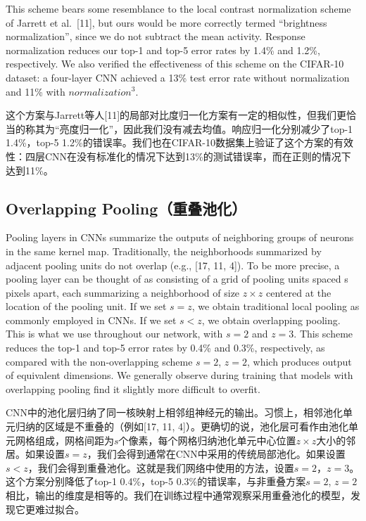 \documentclass[12pt,a4paper,UTF8,twoside]{book}
\begin{document}
This scheme bears some resemblance to the local contrast normalization scheme of Jarrett et al.~{[}11{]}, but ours would be more correctly termed ``brightness normalization'', since we do not subtract the mean activity. Response normalization reduces our top-1 and top-5 error rates by 1.4\% and 1.2\%, respectively. We also verified the effectiveness of this scheme on the CIFAR-10 dataset: a four-layer CNN achieved a 13\% test error rate without normalization and 11\% with \(normalization^3\).

这个方案与Jarrett等人{[}11{]}的局部对比度归一化方案有一定的相似性，但我们更恰当的称其为``亮度归一化''，因此我们没有减去均值。响应归一化分别减少了top-1 1.4\%，top-5 1.2\%的错误率。我们也在CIFAR-10数据集上验证了这个方案的有效性：四层CNN在没有标准化的情况下达到13\%的测试错误率，而在正则的情况下达到11\%。

\hypertarget{overlapping-poolingux91cdux53e0ux6c60ux5316}{%
\subsection{Overlapping Pooling（重叠池化）}\label{overlapping-poolingux91cdux53e0ux6c60ux5316}}

Pooling layers in CNNs summarize the outputs of neighboring groups of neurons in the same kernel map. Traditionally, the neighborhoods summarized by adjacent pooling units do not overlap (e.g., {[}17, 11, 4{]}). To be more precise, a pooling layer can be thought of as consisting of a grid of pooling units spaced s pixels apart, each summarizing a neighborhood of size \(z × z\) centered at the location of the pooling unit. If we set \(s = z\), we obtain traditional local pooling as commonly employed in CNNs. If we set \(s < z\), we obtain overlapping pooling. This is what we use throughout our network, with \(s = 2\) and \(z = 3\). This scheme reduces the top-1 and top-5 error rates by 0.4\% and 0.3\%, respectively, as compared with the non-overlapping scheme \(s = 2\), \(z = 2\), which produces output of equivalent dimensions. We generally observe during training that models with overlapping pooling find it slightly more difficult to overfit.

CNN中的池化层归纳了同一核映射上相邻组神经元的输出。习惯上，相邻池化单元归纳的区域是不重叠的（例如{[}17, 11, 4{]}）。更确切的说，池化层可看作由池化单元网格组成，网格间距为\(s\)个像素，每个网格归纳池化单元中心位置\(z × z\)大小的邻居。如果设置\(s = z\)，我们会得到通常在CNN中采用的传统局部池化。如果设置 \(s < z\)，我们会得到重叠池化。这就是我们网络中使用的方法，设置\(s = 2\)，\(z = 3\)。这个方案分别降低了top-1 0.4\%，top-5 0.3\%的错误率，与非重叠方案\(s = 2\), \(z = 2\)相比，输出的维度是相等的。我们在训练过程中通常观察采用重叠池化的模型，发现它更难过拟合。
\end{document}
